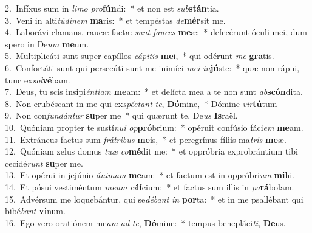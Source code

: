 {2.~}Infíxus sum in \textit{li}\textit{mo} \textit{pro}\textbf{fún}di:~* et non est \textit{sub}\textbf{stán}tia.\\
{3.~}Veni in alti\textit{tú}\textit{di}\textit{nem} \textbf{ma}ris:~* et tempéstas \textit{de}\textbf{mér}sit me.\\
{4.~}Laborávi clamans, raucæ factæ \textit{sunt} \textit{fau}\textit{ces} \textbf{me}æ:~* defecérunt óculi mei, dum spero in De\textit{um} \textbf{me}um.\\
{5.~}Multiplicáti sunt super capíllos \textit{cá}\textit{pi}\textit{tis} \textbf{me}i,~* qui odérunt \textit{me} \textbf{gra}tis.\\
{6.~}Confortáti sunt qui persecúti sunt me inimíci \textit{me}\textit{i} \textit{in}\textbf{jú}ste:~* quæ non rápui, tunc ex\textit{sol}\textbf{vé}bam.\\
{7.~}Deus, tu scis insipi\textit{én}\textit{ti}\textit{am} \textbf{me}am:~* et delícta mea a te non sunt \textit{ab}\textbf{scón}dita.\\
{8.~}Non erubéscant in me qui ex\textit{spé}\textit{ctant} \textit{te}, \textbf{Dó}mine,~* Dómine \textit{vir}\textbf{tú}tum\\
{9.~}Non con\textit{fun}\textit{dán}\textit{tur} \textbf{su}per me~* qui quærunt te, De\textit{us} \textbf{Is}raël.\\
{10.~}Quóniam propter te sustí\textit{nu}\textit{i} \textit{op}\textbf{pró}brium:~* opéruit confúsio fáci\textit{em} \textbf{me}am.\\
{11.~}Extráneus factus sum \textit{frá}\textit{tri}\textit{bus} \textbf{me}is,~* et peregrínus fíliis ma\textit{tris} \textbf{me}æ.\\
{12.~}Quóniam zelus domus \textit{tu}\textit{æ} \textit{co}\textbf{mé}dit me:~* et oppróbria exprobrántium tibi cecidé\textit{runt} \textbf{su}per me.\\
{13.~}Et opérui in jejúnio \textit{á}\textit{ni}\textit{mam} \textbf{me}am:~* et factum est in oppróbri\textit{um} \textbf{mi}hi.\\
{14.~}Et pósui vestiméntum \textit{me}\textit{um} \textit{ci}\textbf{lí}cium:~* et factus sum illis in \textit{pa}\textbf{rá}bolam.\\
{15.~}Advérsum me loquebántur, qui se\textit{dé}\textit{bant} \textit{in} \textbf{por}ta:~* et in me psallébant qui bibé\textit{bant} \textbf{vi}num.\\
{16.~}Ego vero oratiónem me\textit{am} \textit{ad} \textit{te}, \textbf{Dó}mine:~* tempus benepláci\textit{ti}, \textbf{De}us.\\
